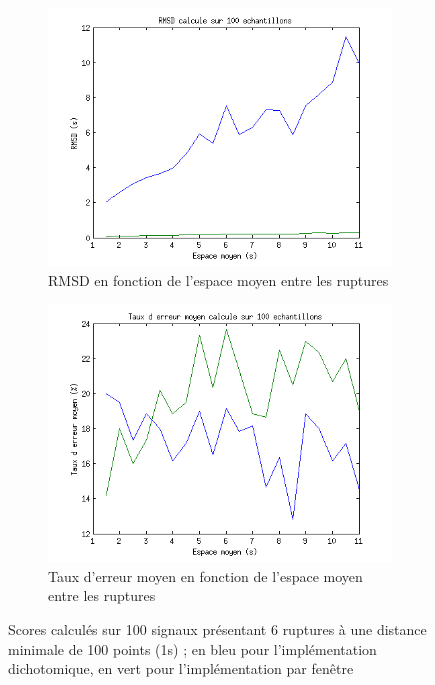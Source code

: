 \documentclass[french,11pt,notitlepage]{report}
\begin{document}
	\begin{figure}[h]
		\begin{subfigure}[t]{.49\textwidth}
		  \includegraphics[width=\linewidth,height=.18\textheight]{rmsd_mean}
			\caption{RMSD en fonction de l'espace moyen entre les ruptures}
			\label{}
		\end{subfigure}
		\hfill
		\begin{subfigure}[t]{.49\textwidth}
			\includegraphics[width=\linewidth,height=.18\textheight]{erratemean_mean}
			\caption{Taux d'erreur moyen en fonction de l'espace moyen entre les ruptures}
			\label{}
		\end{subfigure}
	\caption{Scores calculés sur 100 signaux présentant 6 ruptures à une distance minimale de 100 points (1s) ; en bleu pour l'implémentation dichotomique, en vert pour l'implémentation par fenêtre}
	\label{score_mean}
	\end{figure}
	
\end{document}
